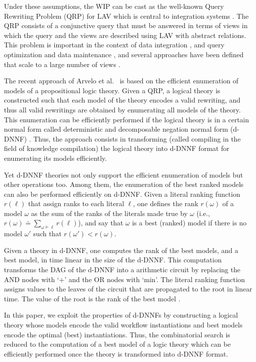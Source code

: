 \documentclass{llncs}
\begin{document}
Under these assumptions, the WIP can be cast as the well-known Query
Rewriting Problem (QRP) for LAV which is central to integration systems
\cite{halevy:survey}. The QRP consists of a conjunctive query that must be
answered in terms of views in which the query and the views are described
using LAV with abstract relations.
This problem is important in the context of data integration
\cite{Chen05,JaudoinPRST05}, and query optimization and data maintenance
\cite{AfratiLU07,levy:bucket}, and several approaches have been defined
that scale to a large number of views
\cite{arvelo:aaai06,pods:DuschkaG97,sac:DuschkaG97,levy:bucket,pottinger:minicon}.

The recent approach of Arvelo et al.\ \cite{arvelo:aaai06} is based 
on the efficient enumeration of models of a propositional logic theory. 
Given a QRP, a logical theory is constructed such that each model of
the theory encodes a valid rewriting, and thus all valid rewritings
are obtained by enumerating all models of the theory. This enumeration
can be efficiently performed if the logical theory is in a certain 
normal form called deterministic and decomposable negation normal
form (d-DNNF) \cite{darwiche:d-dnnfs}. Thus, the approach consists in
transforming (called compiling in the field of knowledge compilation)
the logical theory into d-DNNF format for enumerating its models efficiently.

Yet d-DNNF theories not only support the efficient enumeration of
models but other operations too. Among them, the enumeration of
the best ranked models can also be performed efficiently on d-DNNF.
Given a literal ranking function $r(\ell)$ that assign ranks
to each literal $\ell$, one defines the rank $r(\omega)$ of a
model $\omega$ as the sum of the ranks of the literals made true
by $\omega$ (i.e., $r(\omega)\doteq\sum_{\omega\vDash\ell}r(\ell)$),
and say that $\omega$ is a best (ranked) model if there is no model
$\omega'$ such that $r(\omega')<r(\omega)$.

Given a theory in d-DNNF, one computes the rank of the best models,
and a best model, in time linear in the size of the d-DNNF.
This computation transforms the DAG of the d-DNNF into a arithmetic
circuit by replacing the AND nodes with `+' and the OR nodes with `min'.
The literal ranking function assigns
values to the leaves of the circuit that are propagated to the
root in linear time. The value of the root is the rank of the
best model \cite{darwiche:weighted}.

In this paper, we exploit the properties of d-DNNFs by constructing
a logical theory whose models encode the valid workflow instantiations
and best models encode the optimal (best) instantiations.
Thus, the combinatorial search is reduced to the computation
of a best model of a logic theory which can be efficiently
performed once the theory is transformed into d-DNNF format.
\end{document}
